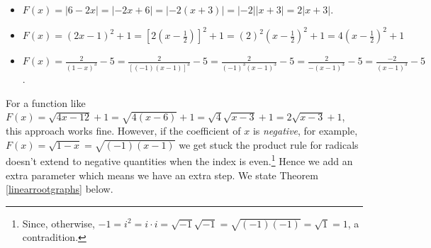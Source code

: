 \begin{itemize}

\item  $F(x) = |6-2x| = |-2x+6| = |-2(x+3)| = |-2||x+3| = 2 |x+3|$.

\item  $F(x) = (2x-1)^2 + 1 = \left[2 \left(x - \frac{1}{2}\right)\right]^2+1 = (2)^2 \left(x - \frac{1}{2}\right)^2  + 1 =  4\left(x - \frac{1}{2}\right)^2 + 1$

\item  $F(x) = \frac{2}{(1-x)^3}- 5 = \frac{2}{[(-1)(x-1)]^3} - 5= \frac{2}{(-1)^3(x-1)^3} - 5 = \frac{2}{- (x-1)^3} - 5 = \frac{-2}{(x-1)^3} - 5$.

\end{itemize}

For a function like $F(x) = \sqrt{4x-12} + 1 = \sqrt{4(x-6)} + 1 = \sqrt{4}\sqrt{x-3} + 1 = 2 \sqrt{x-3} + 1$, this approach works fine.   However, if the coefficient of $x$ is \textit{negative},   for example, $F(x) = \sqrt{1-x} = \sqrt{(-1)(x-1)}$ we get stuck the product rule for radicals doesn't extend to negative quantities when the index is even.\footnote{Since, otherwise, $-1 = i^2 = i \cdot i = \sqrt{-1}\sqrt{-1} = \sqrt{(-1)(-1)} = \sqrt{1} = 1$, a contradition.}   Hence we add an extra parameter which means we have an extra step.  We state Theorem \ref{linearrootgraphs} below.



